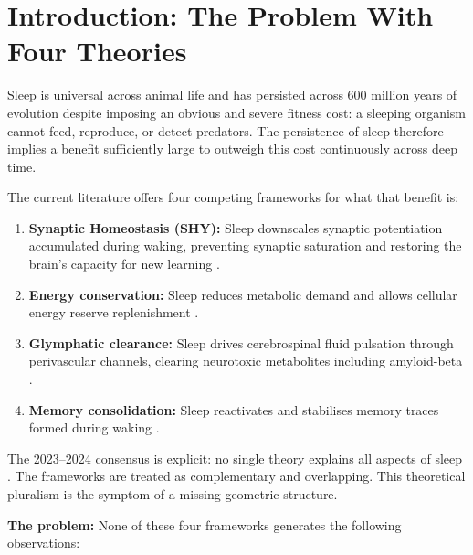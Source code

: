 \documentclass[10pt, a4paper]{article}
\begin{document}
\vspace{0.6em}

\section{Introduction: The Problem With
Four Theories}
\label{sec:intro}

Sleep is universal across animal life
and has persisted across 600 million
years of evolution despite imposing an
obvious and severe fitness cost: a
sleeping organism cannot feed, reproduce,
or detect predators. The persistence
of sleep therefore implies a benefit
sufficiently large to outweigh this
cost continuously across deep time.

The current literature offers four
competing frameworks for what that
benefit is:

\begin{enumerate}[itemsep=0.3em]
  \item \textbf{Synaptic Homeostasis
    (SHY):} Sleep downscales synaptic
    potentiation accumulated during
    waking, preventing synaptic
    saturation and restoring the
    brain's capacity for new learning
    \cite{tononi2006sleep}.

  \item \textbf{Energy conservation:}
    Sleep reduces metabolic demand
    and allows cellular energy reserve
    replenishment \cite{siegel2005clues}.

  \item \textbf{Glymphatic clearance:}
    Sleep drives cerebrospinal fluid
    pulsation through perivascular
    channels, clearing neurotoxic
    metabolites including amyloid-beta
    \cite{xie2013sleep}.

  \item \textbf{Memory consolidation:}
    Sleep reactivates and stabilises
    memory traces formed during waking
    \cite{stickgold2005sleep}.
\end{enumerate}

The 2023--2024 consensus is explicit:
no single theory explains all aspects
of sleep \cite{frank2024sleep}. The
frameworks are treated as complementary
and overlapping. This theoretical
pluralism is the symptom of a missing
geometric structure.

\textbf{The problem:} None of these
four frameworks generates the following
observations:
\end{document}
